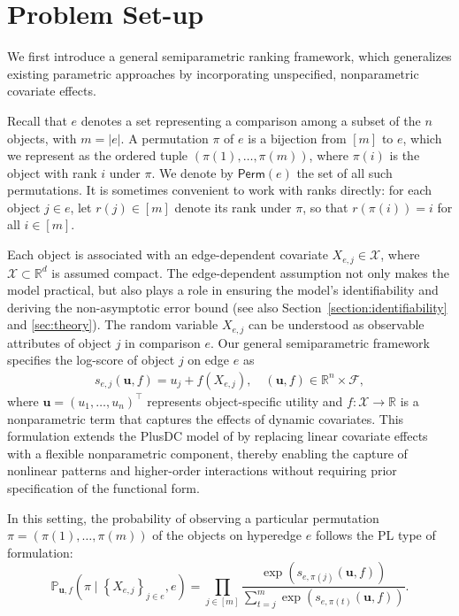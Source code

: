 \documentclass[
  12pt]{article}
\begin{document}
\section{Problem Set-up}\label{sec:2}
We first introduce a general semiparametric ranking framework, which generalizes existing parametric approaches by incorporating unspecified, nonparametric covariate effects.

Recall that $e$ denotes a set representing a comparison among a subset of the $n$ objects, with $m= |e|$. A permutation $\pi$ of $e$ is a bijection from $[m]$ to $e$, which we represent as the ordered tuple $(\pi(1), \ldots, \pi(m))$, where $\pi(i)$ is the object with rank $i$ under $\pi$. We denote by $\mathsf{Perm}(e)$ the set of all such permutations. It is sometimes convenient to work with ranks directly: for each object $j \in e$, let $r(j) \in[m]$ denote its rank under $\pi$, so that $r(\pi(i))=i$ for all $i \in[m]$.

Each object is associated with an edge-dependent covariate $X_{e, j} \in \mathcal{X}$, where $\mathcal{X}\subset\mathbb R^d$ is assumed compact. The edge-dependent assumption not only makes the model practical, but also plays a role in ensuring the model's identifiability and deriving the non-asymptotic error bound (see also Section~\ref{section:identifiability} and \ref{sec:theory}).  The random variable $X_{e, j}$ can be understood as observable attributes of object $j$ in comparison $e$. Our general semiparametric framework specifies the log-score of object $j$ on edge $e$ as
\begin{align}
s_{e,j}(\boldsymbol{u}, f)=u_j+f\left(X_{e, j}\right), \quad (\boldsymbol{u}, f) \in \mathbb{R}^n \times \mathcal{F},\label{semiparametric}
\end{align}
\noindent where $\boldsymbol{u}=\left(u_1, \ldots, u_n\right)^{\top}$ represents object-specific utility and $f: \mathcal{X} \rightarrow \mathbb{R}$ is a nonparametric term that captures the effects of dynamic covariates. This formulation extends the PlusDC model of \citet{dong2025statistical} by replacing linear covariate effects with a flexible nonparametric component, thereby enabling the capture of nonlinear patterns and higher-order interactions without requiring prior specification of the functional form.

In this setting, the probability of observing a particular permutation $\pi=(\pi(1), \ldots, \pi(m))$ of the objects on hyperedge $e$ follows the PL type of formulation:
\begin{equation}
\label{deep_ranking}
    \mathbb{P}_{\boldsymbol{u}, f}\left(\pi \mid \left\{X_{e, j}\right\}_{j \in e},e\right)=\prod_{j \in[m]} \frac{\exp \left(s_{e,\pi(j)}\left(\boldsymbol{u}, f\right)\right)}{\sum_{t=j}^m \exp \left(s_{e,\pi(t)}\left(\boldsymbol{u}, f\right)\right)}.
\end{equation}
\end{document}
